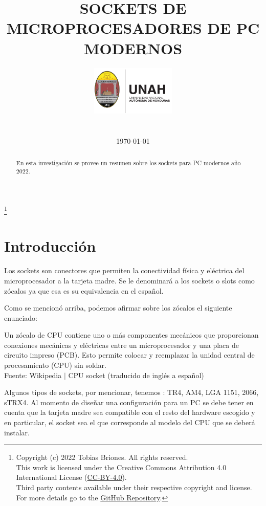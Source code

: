 \documentclass[conference]{IEEEtran}
\title{SOCKETS DE MICROPROCESADORES DE PC MODERNOS}
\author{
\includegraphics[width = 40mm]{images/logo-unah.png}\\[8ex]
\IEEEauthorblockN{Tobias Briones}
\IEEEauthorblockN{tobias.briones@unah.hn}
\IEEEauthorblockA{\textit{Universidad Nacional Autónoma de Honduras} \\
\textit{Ingeniería de Sistemas} \\
\textit{I PAC 2022} \\
\textit{IS911-MICROPROCESADORES}} \\\vspace*{20pt} \normalsize  \\
\today
}
\newcommand\blfootnote[1]{%
  \begingroup
  \renewcommand\thefootnote{}\footnote{#1}%
  \addtocounter{footnote}{-1}%
  \endgroup
}
\begin{document}
\maketitle

\begin{abstract}
En esta investigación se provee un resumen sobre los sockets para PC modernos año 2022.
\end{abstract}

\tableofcontents

\blfootnote{
Copyright (c) 2022 Tobias Briones. All rights reserved. \\
This work is licensed under the Creative Commons Attribution 4.0 International License (\href{https://spdx.org/licenses/CC-BY-4.0}{CC-BY-4.0}). \\
Third party contents available under their respective copyright and license.\\
For more details go to the \href{https://github.com/tobiasbriones/cp-unah-is911-microprocessors}{GitHub Repository}.}

\section{Introducción}

Los sockets son conectores que permiten la conectividad física y eléctrica del microprocesador a la tarjeta madre. Se le denominará a los sockets o slots como zócalos ya que esa es su equivalencia en el español.

\bigbreak

Como se mencionó arriba, podemos afirmar sobre los zócalos el siguiente enunciado:

\begin{displayquote}
    Un zócalo de CPU contiene uno o más componentes mecánicos que proporcionan conexiones mecánicas y eléctricas entre un microprocesador y una placa de circuito impreso (PCB). Esto permite colocar y reemplazar la unidad central de procesamiento (CPU) sin soldar.\\
    \small Fuente: Wikipedia $\mid$ CPU socket (traducido de inglés a español) \cite{wikipedia-contributors-2022}
\end{displayquote}

\bigbreak

Algunos tipos de sockets, por mencionar, tenemos \cite{authortechnews-2020}: TR4, AM4, LGA 1151, 2066, sTRX4. Al momento de diseñar una configuración para un PC se debe tener en cuenta que la tarjeta madre sea compatible con el resto del hardware escogido y en particular, el socket sea el que corresponde al modelo del CPU que se deberá instalar.
\end{document}
